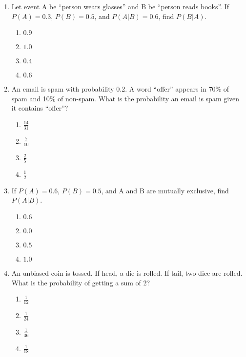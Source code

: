 \begin{enumerate}
\item Let event A be “person wears glasses” and B be “person reads books”. If \(P(A) = 0.3\), \(P(B) = 0.5\), and \(P(A|B) = 0.6\), find \(P(B|A)\).

\begin{enumerate}[label=(\alph*)]
\item \(0.9\) \quad \item \(1.0\) \quad \item \(0.4\) \quad \item \(0.6\)
\end{enumerate}

\item An email is spam with probability 0.2. A word “offer” appears in 70\% of spam and 10\% of non-spam. What is the probability an email is spam given it contains “offer”?

\begin{enumerate}[label=(\alph*)]
\item \(\frac{14}{31}\) \quad \item \(\frac{7}{10}\) \quad \item \(\frac{2}{5}\) \quad \item \(\frac{1}{2}\)
\end{enumerate}

\item If \(P(A) = 0.6\), \(P(B) = 0.5\), and A and B are mutually exclusive, find \(P(A|B)\).

\begin{enumerate}[label=(\alph*)]
\item \(0.6\) \quad \item \(0.0\) \quad \item \(0.5\) \quad \item \(1.0\)
\end{enumerate}

\item An unbiased coin is tossed. If head, a die is rolled. If tail, two dice are rolled. What is the probability of getting a sum of 2?

\begin{enumerate}[label=(\alph*)]
\item \(\frac{1}{12}\) \quad \item \(\frac{1}{24}\) \quad \item \(\frac{1}{36}\) \quad \item \(\frac{1}{18}\)
\end{enumerate}

\end{enumerate}

